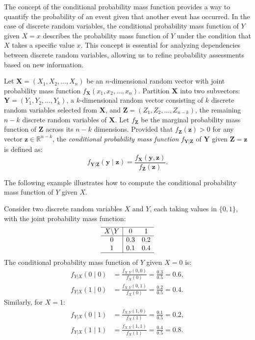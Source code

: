 The concept of the conditional probability mass function provides a way to quantify the probability of an event given that another event has occurred. In the case of discrete random variables, the conditional probability mass function of $Y$ given $X = x$ describes the probability mass function of $Y$ under the condition that $X$ takes a specific value $x$. This concept is essential for analyzing dependencies between discrete random variables, allowing us to refine probability assessments based on new information.

\begin{definition}
\label{def:conditional_probability_function}
Let $\mathbf{X} = (X_{1}, X_{2}, \ldots, X_{n})$ be an $n$-dimensional random vector with joint probability mass function $f_{\mathbf{X}}(x_{1}, x_{2}, \ldots, x_{n})$. Partition $\mathbf{X}$ into two subvectors: $\mathbf{Y} = (Y_{1}, Y_{2}, \ldots, Y_{k})$, a $k$-dimensional random vector consisting of $k$ discrete random variables selected from $\mathbf{X}$, and $\mathbf{Z} = (Z_{1}, Z_{2}, \ldots, Z_{n-k})$, the remaining $n - k$ discrete random variables of $\mathbf{X}$. Let $f_{\mathbf{Z}}$ be the marginal probability mass function of $\mathbf{Z}$ across its $n - k$ dimensions. Provided that $f_{\mathbf{Z}}(\mathbf{z}) > 0$ for any vector $\mathbf{z} \in \mathbb{R}^{n-k}$, the \emph{conditional probability mass function} $f_{\mathbf{Y}|\mathbf{Z}}$ of $\mathbf{Y}$ given $\mathbf{Z} = \mathbf{z}$ is defined as:
\[
f_{\mathbf{Y}|\mathbf{Z}} ( \mathbf{y} \mid \mathbf{z} ) = \frac{f_{\mathbf{X}} ( \mathbf{y}, \mathbf{z} )}{f_{\mathbf{Z}} ( \mathbf{z} )}.
\]
\end{definition}

The following example illustrates how to compute the conditional probability mass function of $Y$ given $X$.

\begin{example}
Consider two discrete random variables $X$ and $Y$, each taking values in $\{0, 1\}$, with the joint probability mass function:
\[
\begin{array}{c|cc}
\hline
X \backslash Y & 0 & 1 \\
\hline
0 & 0.3 & 0.2 \\
1 & 0.1 & 0.4 \\
\hline
\end{array}
\]
The conditional probability mass function of $Y$ given $X = 0$ is:
\[
\begin{aligned}
f_{Y|X}(0 \mid 0) &= \frac{f_{X,Y}(0,0)}{f_{X}(0)} = \frac{0.3}{0.5} = 0.6, \\
f_{Y|X}(1 \mid 0) &= \frac{f_{X,Y}(0,1)}{f_{X}(0)} = \frac{0.2}{0.5} = 0.4.
\end{aligned}
\]
Similarly, for $X = 1$:
\[
\begin{aligned}
f_{Y|X}(0 \mid 1) &= \frac{f_{X,Y}(1,0)}{f_{X}(1)} = \frac{0.1}{0.5} = 0.2, \\
f_{Y|X}(1 \mid 1) &= \frac{f_{X,Y}(1,1)}{f_{X}(1)} = \frac{0.4}{0.5} = 0.8.
\end{aligned}
\]
\end{example}

